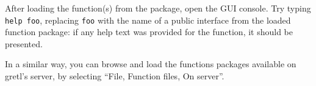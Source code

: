After loading the function(s) from the package, open the GUI console.
Try typing \texttt{help foo}, replacing \texttt{foo} with the name of
a public interface from the loaded function package: if any help text
was provided for the function, it should be presented.

In a similar way, you can browse and load the functions packages
available on gretl's server, by selecting ``File, Function files, On
server''.


